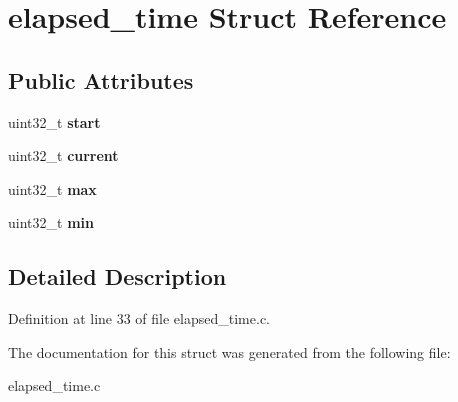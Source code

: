 \hypertarget{structelapsed__time}{}\section{elapsed\+\_\+time Struct Reference}
\label{structelapsed__time}
\subsection*{Public Attributes}
\begin{DoxyCompactItemize}
\item 
\mbox{\label{structelapsed__time_a5d1e04497d6e9b2bc268ca0930cc63ac}} 
uint32\+\_\+t {\bfseries start}
\item 
\mbox{\label{structelapsed__time_af8ede2c6ffd783a973ad292490b0e344}} 
uint32\+\_\+t {\bfseries current}
\item 
\mbox{\label{structelapsed__time_ab988b613d6583fbd4526a5f86caffaf0}} 
uint32\+\_\+t {\bfseries max}
\item 
\mbox{\label{structelapsed__time_adb4f9d6ff2f46961553ac22e87ed86a6}} 
uint32\+\_\+t {\bfseries min}
\end{DoxyCompactItemize}


\subsection{Detailed Description}


Definition at line 33 of file elapsed\+\_\+time.\+c.



The documentation for this struct was generated from the following file\+:\begin{DoxyCompactItemize}
\item 
elapsed\+\_\+time.\+c\end{DoxyCompactItemize}
